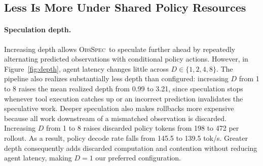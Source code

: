 \documentclass{article} %
\newcommand{\method}{\textsc{ObsSpec}}
\begin{document}
\subsection{Less Is More Under Shared Policy Resources}
\label{sec:configuration-results}

\paragraph{Speculation depth.}

Increasing depth allows \method\ to speculate further ahead by repeatedly alternating predicted observations with conditional policy actions. However, in Figure~\ref{fig:depth}, agent latency changes little across $D\in\{1,2,4,8\}$. The pipeline also realizes substantially less depth than configured: increasing $D$ from 1 to 8 raises the mean realized depth from 0.99 to 3.21, since speculation stops whenever tool execution catches up or an incorrect prediction invalidates the speculative work. Deeper speculation also makes rollbacks more expensive because all work downstream of a mismatched observation is discarded. Increasing $D$ from 1 to 8 raises discarded policy tokens from 198 to 472 per rollout. As a result, policy decode rate falls from 145.5 to 139.5 tok/s. Greater depth consequently adds discarded computation and contention without reducing agent latency, making $D=1$ our preferred configuration.
\end{document}
